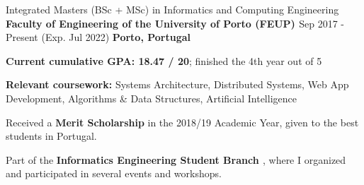 

\begin{cventries}

  \cventry
    {Integrated Masters (BSc + MSc) in Informatics and Computing Engineering} %
    {\textbf{Faculty of Engineering of the University of Porto (FEUP) \href{https://sigarra.up.pt/feup/en/web_page.inicial}{\faExternalLink}}} %
    {Sep 2017 - Present (Exp. Jul 2022)} %
    {\textbf{Porto, Portugal}} %
    {
      \begin{cvitems} %
        \item {\textbf{Current cumulative GPA: 18.47 / 20}; finished the 4th year out of 5}
        \item {\textbf{Relevant coursework:} Systems Architecture, Distributed Systems, Web App Development, Algorithms \& Data Structures, Artificial Intelligence}
        \item {Received a \textbf{Merit Scholarship} in the 2018/19 Academic Year, given to the best students in Portugal.}
        \item {Part of the \textbf{Informatics Engineering Student Branch \href{https://ni.fe.up.pt/}{\faExternalLink}}, where I organized and participated in several events and workshops.}
      \end{cvitems}
    }

\end{cventries}
